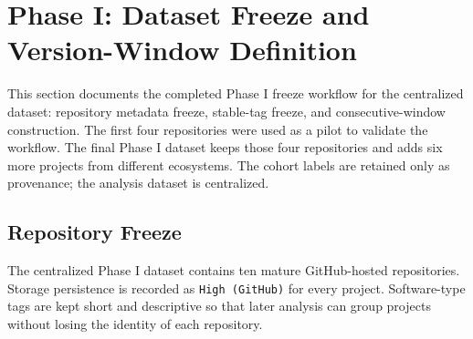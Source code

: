 \section{Phase I: Dataset Freeze and Version-Window Definition}
\label{sec:phase1_dataset_curation}

This section documents the completed Phase I freeze workflow for the centralized dataset:
repository metadata freeze, stable-tag freeze, and consecutive-window construction. The first
four repositories were used as a pilot to validate the workflow. The final Phase I dataset
keeps those four repositories and adds six more projects from different ecosystems. The cohort
labels are retained only as provenance; the analysis dataset is centralized.

\subsection{Repository Freeze}
\label{sec:phase1_frozen_repos}

The centralized Phase I dataset contains ten mature GitHub-hosted repositories. Storage
persistence is recorded as \texttt{High (GitHub)} for every project. Software-type tags are
kept short and descriptive so that later analysis can group projects without losing the
identity of each repository.

